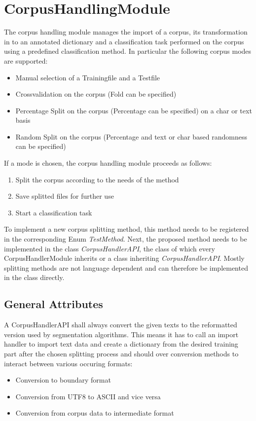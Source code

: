 \documentclass[10pt,a4paper,titlepage]{report}
\begin{document}
	\section{CorpusHandlingModule}
	The corpus handling module manages the import of a corpus, its transformation in to an annotated dictionary and a classification task performed on the corpus using a predefined classification method. In particular the following corpus modes are supported:
	\begin{itemize}
		\item Manual selection of a Trainingfile and a Testfile
		\item Crossvalidation on the corpus (Fold can be specified)
		\item Percentage Split on the corpus (Percentage can be specified) on a char or text basis
		\item Random Split on the corpus (Percentage and text or char based randomness can be specified)
	\end{itemize}
	If a mode is chosen, the corpus handling module proceeds as follows:
	\begin{enumerate}
		\item Split the corpus according to the needs of the method
		\item Save splitted files for further use
		\item Start a classification task
	\end{enumerate}
	To implement a new corpus splitting method, this method needs to be registered in the corresponding Enum \textit{TestMethod}.
	Next, the proposed method needs to be implemented in the class \textit{CorpusHandlerAPI}, the class of which every CorpusHandlerModule inherits or a class inheriting \textit{CorpusHandlerAPI}. Mostly splitting methods are not language dependent and can therefore be implemented in the class directly.
	\subsection{General Attributes}
	A CorpusHandlerAPI shall always convert the given texts to the reformatted version used by segmentation algorithms. This means it has to call an import handler to import text data and create a dictionary from the desired training part after the chosen splitting process and should over conversion methods to interact between various occuring formats:
	\begin{itemize}
		\item Conversion to boundary format
		\item Conversion from UTF8 to ASCII and vice versa
		\item Conversion from corpus data to intermediate format 
	\end{itemize}
	
\end{document}
